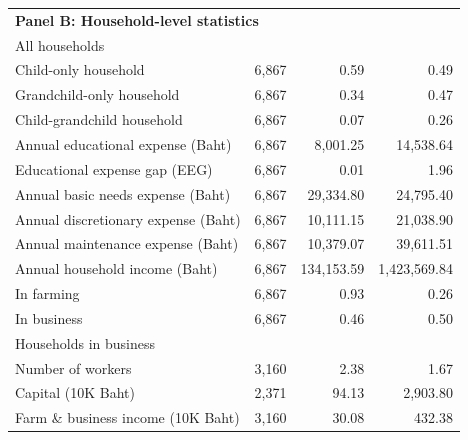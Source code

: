 \begin{center}
\begin{threeparttable}
\begin{tabular}{l*{3}{r}}
\hline \multicolumn{4}{l}{\textbf{Panel B: Household-level statistics}}\\
All households      &            &            &            \\
\hspace{5pt} Child-only household&       6,867&        0.59&        0.49\\
\hspace{5pt} Grandchild-only household&       6,867&        0.34&        0.47\\
\hspace{5pt} Child-grandchild household&       6,867&        0.07&        0.26\\
\hspace{5pt} Annual educational expense (Baht)&       6,867&    8,001.25&   14,538.64\\
\hspace{5pt} Educational expense gap (EEG)&       6,867&        0.01&        1.96\\
\hspace{5pt} Annual basic needs expense (Baht)&       6,867&   29,334.80&   24,795.40\\
\hspace{5pt} Annual discretionary expense (Baht)&       6,867&   10,111.15&   21,038.90\\
\hspace{5pt} Annual maintenance expense (Baht)&       6,867&   10,379.07&   39,611.51\\
\hspace{5pt} Annual household income (Baht)&       6,867&  134,153.59&1,423,569.84\\
\hspace{5pt} In farming&       6,867&        0.93&        0.26\\
\hspace{5pt} In business&       6,867&        0.46&        0.50\\
Households in business&            &            &            \\
\hspace{5pt} Number of workers&       3,160&        2.38&        1.67\\
\hspace{5pt} Capital (10K Baht)&       2,371&       94.13&    2,903.80\\
\hspace{5pt} Farm \& business income (10K Baht)&       3,160&       30.08&      432.38\\
 \hline \end{tabular} \end{threeparttable} \end{center}
